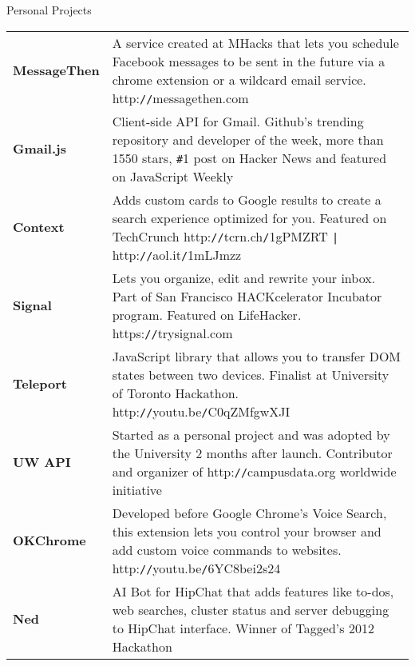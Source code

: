 \documentclass[oneside]{resume}
\begin{document}
  \begin{rSection}{Personal Projects}

    \begin{tabular}{@{} >{\bfseries}l @{\hspace{1ex}:\hspace{1ex}} p{14.5cm}}
      MessageThen & A service created at MHacks that lets you schedule Facebook messages to be sent in the future via
                    a chrome extension or a wildcard email service. http:\texttt{//}messagethen.com \\[0.5ex]

      Gmail.js & Client-side API for Gmail. Github's trending repository and developer of the week, more than 1550 stars,
                 \texttt{\#}1 post on Hacker News and featured on JavaScript Weekly \\[0.5ex]

      Context  & Adds custom cards to Google results to create a search experience optimized for you. 
                 Featured on TechCrunch http:\texttt{//}tcrn.ch\texttt{/}1gPMZRT \texttt{|} http:\texttt{//}aol.it\texttt{/}1mLJmzz \\[0.5ex]

      Signal   & Lets you organize, edit and rewrite your inbox. Part of San Francisco HACKcelerator
                 Incubator program. Featured on LifeHacker. https:\texttt{//}trysignal.com \\[0.5ex]

      Teleport & JavaScript library that allows you to transfer DOM states between two devices.
                 Finalist at University of Toronto Hackathon. http:\texttt{//}youtu.be\texttt{/}C0qZMfgwXJI \\[0.5ex]

      UW API   & Started as a personal project and was adopted by the University 2 months after launch.
                 Contributor and organizer of http:\texttt{//}campusdata.org worldwide initiative  \\[0.5ex]

      OKChrome & Developed before Google Chrome's Voice Search, this extension lets you control your browser
                 and add custom voice commands to websites. http:\texttt{//}youtu.be\texttt{/}6YC8bei2s24 \\[0.5ex]

      Ned      & AI Bot for HipChat that adds features like to-dos, web searches, cluster status and server
                 debugging to HipChat interface. Winner of Tagged's 2012 Hackathon \\
    \end{tabular}

  \end{rSection}
\end{document}
